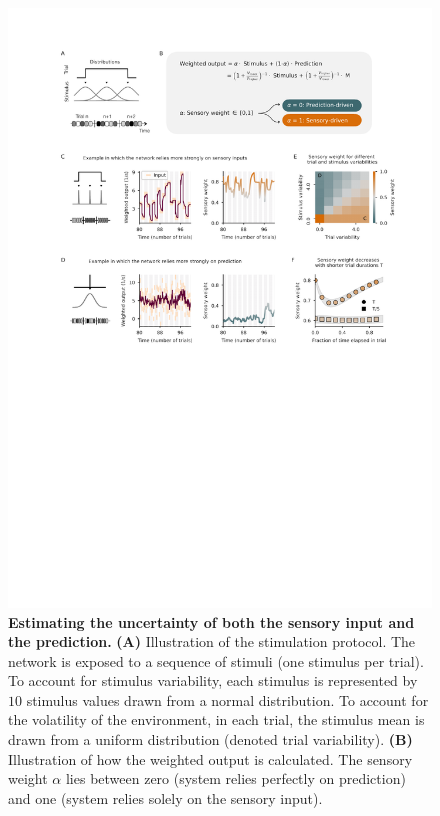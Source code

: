 \documentclass[10pt,a4paper,draft]{article}
\begin{document}
\begin{figure}[t!]
	\centering
    \includegraphics[width=1\linewidth]{../results/figures/final/Fig_3}
\caption{\footnotesize{\bf Estimating the uncertainty of both the sensory input and the prediction.\newline} 
{\bf (A)} Illustration of the stimulation protocol. The network is exposed to a sequence of stimuli (one stimulus per trial). To account for stimulus variability, each stimulus is represented by $10$ stimulus values drawn from a normal distribution. To account for the volatility of the environment, in each trial, the stimulus mean is drawn from a uniform distribution (denoted trial variability). 
{\bf (B)} Illustration of how the weighted output is calculated. The sensory weight $\alpha$ lies between zero (system relies perfectly on prediction) and one (system relies solely on the sensory input).
}
\end{figure}
\end{document}
